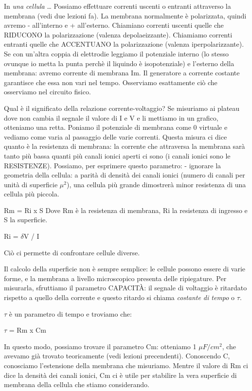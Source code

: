 \documentclass[a4paper,12pt]{article}
\begin{document}
In \emph{una cellula} \dots
Possiamo effettuare correnti uscenti o entranti attraverso la membrana (vedi due lezioni fa). La membrana normalmente è polarizzata, quindi avremo - all'interno e + all'esterno. 
Chiamiano correnti uscenti quelle che RIDUCONO la polarizzazione (valenza depolaeizzante).
Chiamiamo correnti entranti quelle che ACCENTUANO la polarizzazione (valenza iperpolarizzante).
Se con un'altra coppia di elettrodie leggiamo il potenziale 
interno (lo stesso ovunque io metta la punta perchè il liquindo è isopotenziale) e l'esterno della membrana: avremo corrente di membrana Im. Il generatore a corrente costante garantisce che essa non vari nel tempo. Osserviamo esattamente ciò che osserviamo nel circuito fisico.

Qual è il significato della relazione corrente-voltaggio?
Se misuriamo ai plateau dove non cambia il segnale il valore di I e V e li mettiamo in un grafico, otteniamo una retta. Poniamo il potenziale di membrana come 0 virtuale e vediamo come varia al passaggio delle varie correnti.
Questa misura ci dice quanto è la resistenza di membrana: la corrente che attraversa la membrana sarà tanto più bassa quanti più canali ionici aperti ci sono (i canali ionici sono le RESISTENZE). 
Possiamo, per esprimere questo parametro:
- ignorare la geometria della cellula: a parità di densità dei canali ionici (numero di canali per unità di superficie $\mu^{2}$), una cellula più grande dimostrerà minor resistenza di una cellula più piccola.

					Rm = Ri x S
Dove Rm è la resistenza di membrana, Ri la resistenza di ingresso e S la superficie.

					Ri = $\delta$V / I

Ciò ci permette di confrontare cellule diverse.

Il calcolo della superficie non è sempre semplice: le cellule possono essere di varie forme, e la membrana a livello microscopico presenta delle ripiegature.
Per misurarla, sfruttiamo il parametro CAPACITÀ: il segnale di voltaggio è ritardato rispetto a quello della corrente e questo ritardo si chiama \emph{costante di tempo} o $\tau$.

$\tau$ è un parametro di tempo e troviamo che:
				
					$\tau$ = Rm x Cm

In questo modo, possiamo trovare il parametro Cm: otteniamo 1 $\mu F/cm^{2}$, che avevamo già trovato teoricamente (vedi lezioni precendenti). 
Conoscendo C, conosciamo l'estensione della membrana che misuriamo.
Mentre il valore di Rm ci dice la densità dei canali ionici, Cm ci è utile per stabilire la vera superficie di membrana della cellula che stiamo considerando.
\end{document}
